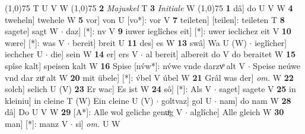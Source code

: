 \documentclass[8pt,a4paper,notitlepage]{article}
\begin{document}
\begin{table}[ht]
\begin{minipage}[t]{0.5\linewidth}
\scriptsize
\line(1,0){75} \newline
T U V W \newline
\line(1,0){75} \newline
\textbf{2} \textit{Majuskel} T  \textbf{3} \textit{Initiale} W  \newline
\line(1,0){75} \newline
\textbf{1} dâ] do U V W \textbf{4} tweheln] twehele W \textbf{5} vor] von U [vo*]: vor V \textbf{7} teileten] [teilen]: teileten T \textbf{8} sagete] sagt W  $\cdot$ daz] [*]: nv V \textbf{9} iuwer ieglîches eit] [*]: uwer ieclichez eit V \textbf{10} wære] [*]: was V  $\cdot$ bereit] breit U \textbf{11} des] es W \textbf{13} swâ] Wa U (W)  $\cdot$ ieglîcher] iechcher U  $\cdot$ die] sein W \textbf{14} er] ers V  $\cdot$ al bereit] albereit do V do beraitet W \textbf{15} spîse kalt] speisen kalt W \textbf{16} Spise [nv́w*]: nv́we vnde darzvͦ alt V  $\cdot$ Speise neúwe vnd dar zuͦ alt W \textbf{20} mit übele] [*]: v́bel V úbel W \textbf{21} Grâl was der] \textit{om.} W \textbf{22} solch] selich U (V) \textbf{23} Er wac] Es ist W \textbf{24} sô] [*]: Als V  $\cdot$ saget] sagete V \textbf{25} in kleiniu] in cleine T (W) Ein cleine U (V)  $\cdot$ goltvaz] gol U  $\cdot$ nam] do nam W \textbf{28} dâ] Do U V W \textbf{29} [A*]: Alle wol geliche genuͦg V  $\cdot$ alglîche] Alle gleich W \textbf{30} man] [*]: manz V  $\cdot$ si] \textit{om.} U W \newline
\end{minipage}
\end{table}
\end{document}
